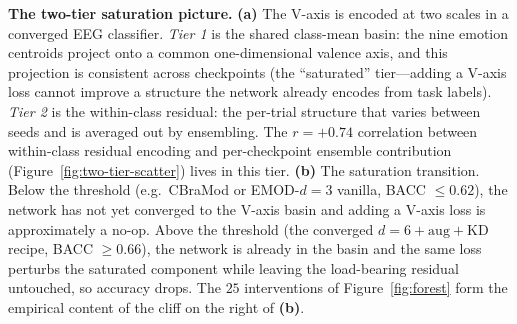 \textbf{The two-tier saturation picture.}
\textbf{(a)} The V-axis is encoded at two scales in a converged EEG
classifier. \emph{Tier 1} is the shared class-mean basin: the nine
emotion centroids project onto a common one-dimensional valence axis,
and this projection is consistent across checkpoints (the
``saturated'' tier---adding a V-axis loss cannot improve a structure
the network already encodes from task labels). \emph{Tier 2} is the
within-class residual: the per-trial structure that varies between
seeds and is averaged out by ensembling. The $r{=}{+}0.74$
correlation between within-class residual encoding and per-checkpoint
ensemble contribution (Figure~\ref{fig:two-tier-scatter}) lives in
this tier. \textbf{(b)} The saturation transition. Below the
threshold (e.g.\ CBraMod or EMOD-$d{=}3$ vanilla, BACC ${\le}0.62$),
the network has not yet converged to the V-axis basin and adding a
V-axis loss is approximately a no-op. Above the threshold (the converged
$d{=}6+\text{aug}+\text{KD}$ recipe, BACC ${\ge}0.66$), the network
is already in the basin and the same loss perturbs the saturated
component while leaving the load-bearing residual untouched, so
accuracy drops. The $25$ interventions of
Figure~\ref{fig:forest} form the empirical content of the cliff on
the right of \textbf{(b)}.

